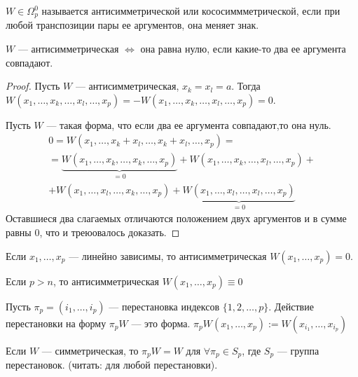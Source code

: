 \begin{Def}
	$W\in\Omega_p^0$ называется антисимметрической или кососиммметрической, если при любой транспозиции пары ее аргументов, она меняет знак.
\end{Def}

\begin{prop}
	$W$ --- антисимметрическая $\Leftrightarrow$ она равна нулю, если какие-то два ее аргумента совпадают.
\end{prop}

\begin{proof}
	Пусть $W$ --- антисимметрическая, $x_k=x_l=a$. Тогда $W(x_1, \ldots, x_k, \ldots, x_l, \ldots, x_p)=-W(x_1, \ldots, x_k, \ldots, x_l, \ldots, x_p) = 0$.
	
	Пусть $W$ --- такая форма, что если два ее аргумента совпадают,то она нуль. 
	\begin{multline*}
		0=
		W(x_1, \ldots, x_k+x_l, \ldots, x_k+x_l, \ldots, x_p)=\\=
		\underbrace{W(x_1, \ldots, x_k, \ldots, x_k, \ldots, x_p)}_{=0}+
		W(x_1, \ldots, x_k, \ldots, x_l, \ldots, x_p)+\\+
		W(x_1, \ldots, x_l, \ldots, x_k, \ldots, x_p)+
		\underbrace{W(x_1, \ldots, x_l, \ldots, x_l, \ldots, x_p)}_{=0}
	\end{multline*}
Оставшиеся два слагаемых отличаются положением двух аргументов и в сумме равны 0, что и треюовалось доказать.
\end{proof}

\begin{corollary}[1]
	Если $x_1, \ldots, x_p$ --- линейно зависимы, то антисимметрическая $W(x_1, \ldots, x_p)=0$.
\end{corollary}

\begin{corollary}[2]
	Если $p>n$, то антисимметрическая $W(x_1, \ldots, x_p)\equiv0$
\end{corollary}

\begin{Def}
	Пусть $\pi_p=(i_1, \ldots, i_p)$ --- перестановка индексов $\{1, 2, \ldots, p\}$. Действие перестановки на форму $\pi_pW$ --- это форма. $\pi_pW(x_1, \ldots, x_p):=W(x_{i_1}, \ldots, x_{i_p})$
\end{Def}

\begin{prop}
	Если $W$ --- симметрическая, то $\pi_pW=W$ для $\forall \pi_p\in S_p$, где $S_p$ --- группа перестановок. (читать: для любой перестановки).
\end{prop}

